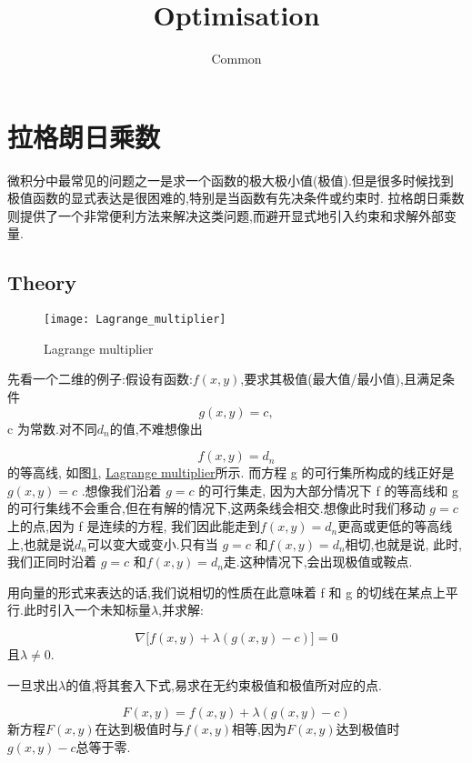\documentclass{article}
\begin{document}
\title{Optimisation}
\author{Common}
\maketitle
\newpage
\tableofcontents
\newpage

\section{拉格朗日乘数}
微积分中最常见的问题之一是求一个函数的极大极小值(极值).但是很多时候找到极值函数的显式表达是很困难的,特别是当函数有先决条件或约束时.
拉格朗日乘数则提供了一个非常便利方法来解决这类问题,而避开显式地引入约束和求解外部变量.

\subsection{Theory}
\begin{figure}[htbp]
  \centering
  \texttt{[image: Lagrange\_multiplier]}\\
  \caption{Lagrange multiplier}\label{fig.Lagrange.multiplier}
\end{figure}

先看一个二维的例子:假设有函数:$f(x, y)$,要求其极值(最大值/最小值),且满足条件
$$ g\left( x,y \right) = c, $$
c 为常数.对不同$d_n$的值,不难想像出

$$ f \left( x, y \right)=d_n $$
的等高线, 如图\ref{fig.Lagrange.multiplier}, 
\href{http://upload.wikimedia.org/wikipedia/commons/thumb/f/fa/Lagrange\_multiplier.png/300px-Lagrange\_multiplier.png}{Lagrange multiplier}所示.
而方程 g 的可行集所构成的线正好是 $g ( x, y ) = c$ .想像我们沿着 $g = c$ 的可行集走,
因为大部分情况下 f 的等高线和 g 的可行集线不会重合,但在有解的情况下,这两条线会相交.想像此时我们移动 $g = c$ 上的点,因为 f 是连续的方程,
我们因此能走到$f \left( x, y \right)=d_n$更高或更低的等高线上,也就是说$d_n$可以变大或变小.只有当 $g = c$ 和$f \left( x, y \right)=d_n$相切,也就是说,
此时,我们正同时沿着 $g = c$ 和$f \left( x, y \right)=d_n$走.这种情况下,会出现极值或鞍点.

用向量的形式来表达的话,我们说相切的性质在此意味着 f 和 g 的切线在某点上平行.此时引入一个未知标量$\lambda$,并求解:

$$ \nabla \Big[f \left(x, y \right) + \lambda \left(g \left(x, y \right) - c \right) \Big] = 0 $$
且$\lambda \neq 0$.

一旦求出$\lambda$的值,将其套入下式,易求在无约束极值和极值所对应的点.

$$ F \left( x , y \right)  =  f \left( x , y \right) + \lambda \left( g \left( x , y \right) - c \right) $$
新方程$F(x,y)$在达到极值时与$f(x,y)$相等,因为$F(x,y)$达到极值时$g(x,y)-c$总等于零.
\end{document}
